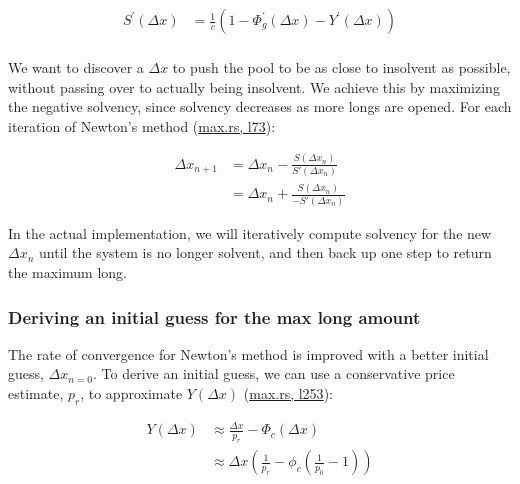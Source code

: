 \begin{equation}
\begin{aligned}
S^{\prime}(\Delta x) &= \tfrac{1}{c} \left( 1 - \Phi_{g}^{\prime}(\Delta x) - Y^{\prime}(\Delta x) \right) \\
\end{aligned}
\end{equation}

We want to discover a $\Delta x$ to push the pool to be as close to insolvent as possible, without passing over to actually being insolvent.
We achieve this by maximizing the negative solvency, since solvency decreases as more longs are opened.
For each iteration of Newton's method (\href{https://github.com/delvtech/hyperdrive/blob/f410574fffcb8b2556208c158494ba2972525843/crates/hyperdrive-math/src/long/max.rs#L73}{max.rs, l73}):

\begin{equation}
\begin{aligned}
\Delta x_{n+1} &= \Delta x_n - \tfrac{S(\Delta x_n)}{S'(\Delta x_n)} \\
&= \Delta x_n + \tfrac{S(\Delta x_n)}{-S'(\Delta x_n)}
\end{aligned}
\end{equation}

In the actual implementation, we will iteratively compute solvency for the new $\Delta x_{n}$ until the system is no longer solvent, and then back up one step to return the maximum long.

\subsubsection{Deriving an initial guess for the max long amount}

The rate of convergence for Newton's method is improved with a better initial guess, $\Delta x_{n=0}$.
To derive an initial guess, we can use a conservative price estimate, $p_{r}$, to approximate $Y(\Delta x)$ (\href{https://github.com/delvtech/hyperdrive/blob/f410574fffcb8b2556208c158494ba2972525843/crates/hyperdrive-math/src/long/max.rs#L253}{max.rs, l253}):

\begin{equation}\label{approx-long-amount}
\begin{aligned}
Y(\Delta x) &\approx \tfrac{\Delta x}{p_{r}} - \Phi_{c}(\Delta x) \\
&\approx \Delta x \left( \tfrac{1}{p_{r}} - \phi_{c} \left( \tfrac{1}{p_{0}} - 1 \right) \right) \\
\end{aligned}
\end{equation}

